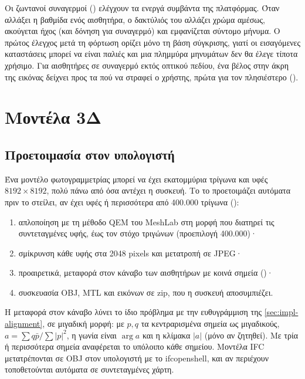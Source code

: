 Οι ζωντανοί συναγερμοί () ελέγχουν τα ενεργά συμβάντα της πλατφόρμας. Όταν αλλάξει η βαθμίδα ενός αισθητήρα, ο δακτύλιός του αλλάζει χρώμα αμέσως, ακούγεται ήχος (και δόνηση για συναγερμό) και εμφανίζεται σύντομο μήνυμα. Ο πρώτος έλεγχος μετά τη φόρτωση ορίζει μόνο τη βάση σύγκρισης, γιατί οι εισαγόμενες καταστάσεις μπορεί να είναι παλιές και μια πλημμύρα μηνυμάτων δεν θα έλεγε τίποτα χρήσιμο. Για αισθητήρες σε συναγερμό εκτός οπτικού πεδίου, ένα βέλος στην άκρη της εικόνας δείχνει προς τα πού να στραφεί ο χρήστης, πρώτα για τον πλησιέστερο ().

\section{Μοντέλα 3Δ}
\label{sec:impl-models}

\subsection{Προετοιμασία στον υπολογιστή}
Ένα μοντέλο φωτογραμμετρίας μπορεί να έχει εκατομμύρια τρίγωνα και υφές $8192 \times 8192$, πολύ πάνω από όσα αντέχει η συσκευή. Το  το προετοιμάζει αυτόματα πριν το στείλει, αν έχει υφές ή περισσότερα από 400.000 τρίγωνα ():
\begin{enumerate}
  \item απλοποίηση με τη μέθοδο QEM του MeshLab \cite{garland1997qem,cignoni2008meshlab} στη μορφή που διατηρεί τις συντεταγμένες υφής, έως τον στόχο τριγώνων (προεπιλογή 400.000)·
  \item σμίκρυνση κάθε υφής στα 2048 pixels και μετατροπή σε JPEG·
  \item προαιρετικά, μεταφορά στον κάναβο των αισθητήρων με κοινά σημεία ()·
  \item συσκευασία OBJ, MTL και εικόνων σε zip, που η συσκευή αποσυμπιέζει.
\end{enumerate}
Η μεταφορά στον κάναβο λύνει το ίδιο πρόβλημα με την ευθυγράμμιση της \cref{sec:impl-alignment}, σε μιγαδική μορφή: με $p, q$ τα κεντραρισμένα σημεία ως μιγαδικούς, $a = \sum q\bar{p} / \sum |p|^2$, η γωνία είναι $\arg a$ και η κλίμακα $|a|$ (μόνο αν ζητηθεί). Με τρία ή περισσότερα σημεία αναφέρεται το υπόλοιπο κάθε σημείου. Μοντέλα IFC μετατρέπονται σε OBJ στον υπολογιστή με το ifcopenshell, και αν περιέχουν  τοποθετούνται αυτόματα σε συντεταγμένες χάρτη.

